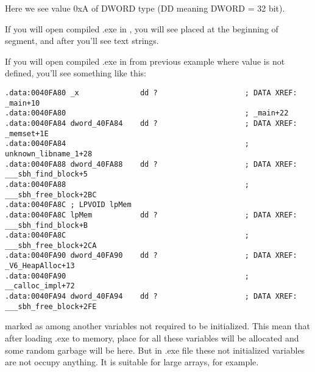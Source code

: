 {Here we see value 0xA of DWORD type (DD meaning DWORD = 32 bit).}

{If you will open compiled .exe in \IDA, you will see  placed at the beginning of 
 segment, and after you'll see text strings.}

{If you will open compiled .exe in \IDA from previous example where  value is not defined, 
you'll see something like this:}

\begin{lstlisting}
.data:0040FA80 _x              dd ?                    ; DATA XREF: _main+10
.data:0040FA80                                         ; _main+22
.data:0040FA84 dword_40FA84    dd ?                    ; DATA XREF: _memset+1E
.data:0040FA84                                         ; unknown_libname_1+28
.data:0040FA88 dword_40FA88    dd ?                    ; DATA XREF: ___sbh_find_block+5
.data:0040FA88                                         ; ___sbh_free_block+2BC
.data:0040FA8C ; LPVOID lpMem
.data:0040FA8C lpMem           dd ?                    ; DATA XREF: ___sbh_find_block+B
.data:0040FA8C                                         ; ___sbh_free_block+2CA
.data:0040FA90 dword_40FA90    dd ?                    ; DATA XREF: _V6_HeapAlloc+13
.data:0040FA90                                         ; __calloc_impl+72
.data:0040FA94 dword_40FA94    dd ?                    ; DATA XREF: ___sbh_free_block+2FE
\end{lstlisting}

{ marked as  among another variables not required to be initialized. 
This mean that after loading .exe to memory, place for all these variables will be 
allocated and some random garbage will be here. 
But in .exe file these not initialized variables are not occupy anything. 
It is suitable for large arrays, for example.}

